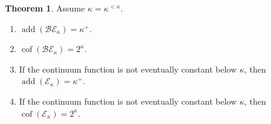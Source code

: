 \documentclass[10pt,a4paper]{amsart}
\theoremstyle{definition}
\newtheorem{thm}{Theorem}[section]
\newcommand{\cal}{\mathcal}
\newcommand{\cof}{\operatorname{cof}}
\newcommand{\add}{\operatorname{add}}
\newcommand{\Ek}{\cal{E}_\kappa}
\newcommand{\BEk}{\cal{BE}_\kappa}
\begin{document}
	\begin{thm}\label{thm:add BEk and Ek are absolute}
		Assume $\kappa=\kappa^{<\kappa}$.
		\begin{enumerate}[label=(\arabic*)]
			\item\label{thm:add BEk is absolute} $\add(\BEk)=\kappa^+$.
			\item\label{thm:cof BEk is absolute} $\cof(\BEk)=2^\kappa$.
			\item\label{thm:add Ek is absolute} If the continuum function is not eventually constant below $\kappa$, then $\add(\Ek)=\kappa^+$.
			\item\label{thm:cof Ek is absolute} If the continuum function is not eventually constant below $\kappa$, then $\cof(\Ek)=2^\kappa$.
		\end{enumerate}
	\end{thm}
\end{document}
